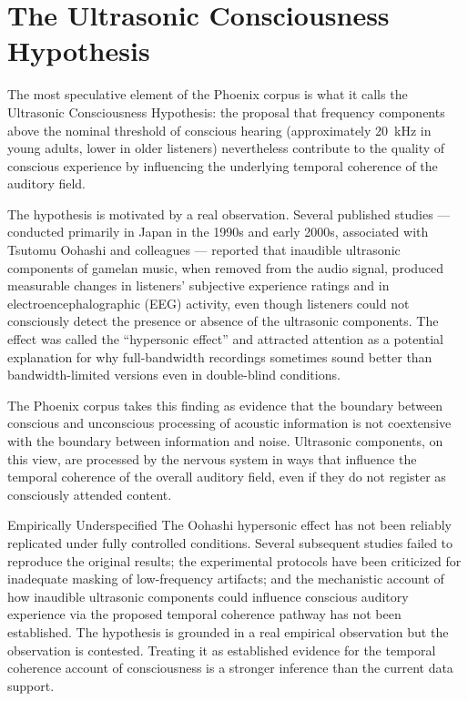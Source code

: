\section{The Ultrasonic Consciousness Hypothesis}
\label{sec:ultrasonic}

The most speculative element of the Phoenix corpus is what it
calls the Ultrasonic Consciousness Hypothesis: the proposal
that frequency components above the nominal threshold of
conscious hearing (approximately 20~kHz in young adults,
lower in older listeners) nevertheless contribute to the
quality of conscious experience by influencing the underlying
temporal coherence of the auditory field.

The hypothesis is motivated by a real observation. Several
published studies --- conducted primarily in Japan in the
1990s and early 2000s, associated with Tsutomu Oohashi and
colleagues --- reported that inaudible ultrasonic components
of gamelan music, when removed from the audio signal, produced
measurable changes in listeners' subjective experience ratings
and in electroencephalographic (EEG) activity, even though
listeners could not consciously detect the presence or absence
of the ultrasonic components. The effect was called the
``hypersonic effect'' and attracted attention as a potential
explanation for why full-bandwidth recordings sometimes sound
better than bandwidth-limited versions even in double-blind
conditions.

The Phoenix corpus takes this finding as evidence that the
boundary between conscious and unconscious processing of
acoustic information is not coextensive with the boundary
between information and noise. Ultrasonic components, on
this view, are processed by the nervous system in ways that
influence the temporal coherence of the overall auditory
field, even if they do not register as consciously attended
content.

\begin{epistemicstatus}{Empirically Underspecified}
The Oohashi hypersonic effect has not been reliably replicated
under fully controlled conditions. Several subsequent studies
failed to reproduce the original results; the experimental
protocols have been criticized for inadequate masking of
low-frequency artifacts; and the mechanistic account of how
inaudible ultrasonic components could influence conscious
auditory experience via the proposed temporal coherence pathway
has not been established. The hypothesis is grounded in a real
empirical observation but the observation is contested.
Treating it as established evidence for the temporal coherence
account of consciousness is a stronger inference than the
current data support.
\end{epistemicstatus}


